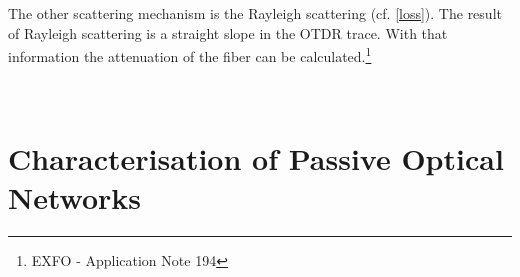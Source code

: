 The other scattering mechanism is the Rayleigh scattering (cf. \ref{loss}). The result of Rayleigh scattering is a straight slope in the OTDR trace. With that information the attenuation of the fiber can be calculated.\footnote[1]{EXFO - Application Note 194}





\


\section{Characterisation of Passive Optical Networks}